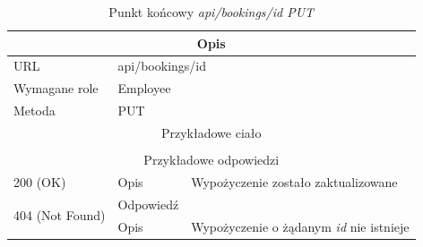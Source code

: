 \documentclass[eng,printmode,openany]{mgr}
\begin{document}
	\begin{table}[H]
		\caption{Punkt końcowy \textit{api/bookings/id PUT}}
		\begin{tabularx}{\textwidth}{|l|l|X|}
			\hline
			\multicolumn{3}{|c|}{Opis}                         						                \\ \hline
			URL                       & \multicolumn{2}{l|}{api/bookings/id} 	                \\ \hline
			Wymagane role             & \multicolumn{2}{l|}{Employee}                 \\ \hline	
			Metoda                    & \multicolumn{2}{l|}{PUT} 					                \\ \hline
			\multicolumn{3}{|c|}{Przykładowe ciało}         						                \\ \hline
			\multicolumn{3}{|c|}{} 	\\ \hline
			\multicolumn{3}{|c|}{Przykładowe odpowiedzi}                   		                    \\ \hline
			200 (OK)			& Opis         	& Wypożyczenie zostało zaktualizowane									           \\ \hline
			\multirow{2}{*}{404 (Not Found)} 	& Odpowiedź     &      \\ \cline{2-3} 
			& Opis          & Wypożyczenie o żądanym \textit{id} nie istnieje  							       \\ \hline
		\end{tabularx}
	\end{table}
	
\end{document}
